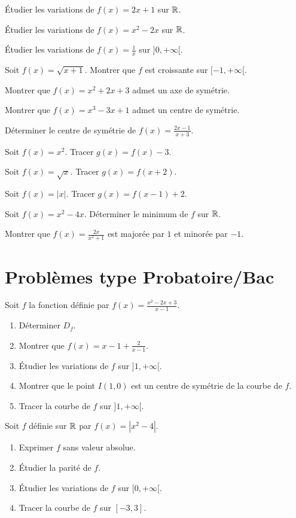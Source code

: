 
\exo{} Étudier les variations de $f(x)=2x+1$ sur $\mathbb{R}$.

\exo{} Étudier les variations de $f(x)=x^2-2x$ sur $\mathbb{R}$.

\exo{} Étudier les variations de $f(x)=\frac{1}{x}$ sur $]0,+\infty[$.

\exo{} Soit $f(x)=\sqrt{x+1}$. Montrer que $f$ est croissante sur $[-1,+\infty[$.


\exo{} Montrer que $f(x)=x^2+2x+3$ admet un axe de symétrie.

\exo{} Montrer que $f(x)=x^3-3x+1$ admet un centre de symétrie.

\exo{} Déterminer le centre de symétrie de $f(x)=\frac{2x-1}{x+3}$.


\exo{} Soit $f(x)=x^2$. Tracer $g(x)=f(x)-3$.

\exo{} Soit $f(x)=\sqrt{x}$. Tracer $g(x)=f(x+2)$.

\exo{} Soit $f(x)=|x|$. Tracer $g(x)=f(x-1)+2$.

\exo{} Soit $f(x)=x^2-4x$. Déterminer le minimum de $f$ sur $\mathbb{R}$.

\exo{} Montrer que $f(x)=\frac{2x}{x^2+1}$ est majorée par $1$ et minorée par $-1$.

\section{Problèmes type Probatoire/Bac}

Soit $f$ la fonction définie par $f(x)=\frac{x^2-2x+3}{x-1}$.
\begin{enumerate}[label=\arabic*)]
\item Déterminer $D_f$.
\item Montrer que $f(x)=x-1+\frac{2}{x-1}$.
\item Étudier les variations de $f$ sur $]1,+\infty[$.
\item Montrer que le point $I(1,0)$ est un centre de symétrie de la courbe de $f$.
\item Tracer la courbe de $f$ sur $]1,+\infty[$.
\end{enumerate}

Soit $f$ définie sur $\mathbb{R}$ par $f(x)=|x^2-4|$.
\begin{enumerate}[label=\arabic*)]
\item Exprimer $f$ sans valeur absolue.
\item Étudier la parité de $f$.
\item Étudier les variations de $f$ sur $[0,+\infty[$.
\item Tracer la courbe de $f$ sur $[-3,3]$.
\end{enumerate}

